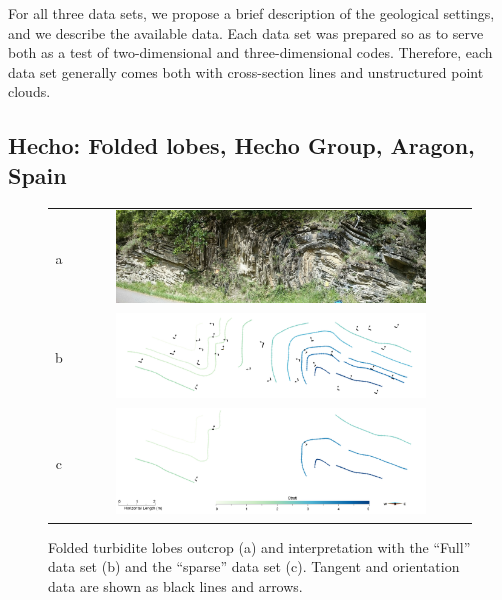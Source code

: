\documentclass[preprint]{ring20}
\begin{document}
For all three data sets, we propose a brief description of the geological settings, and we describe the available data. Each data set was prepared so as to serve both as a test of two-dimensional and three-dimensional codes. Therefore, each data set generally comes both with cross-section lines and unstructured point clouds.


\subsection{Hecho: Folded lobes, Hecho Group, Aragon, Spain}
\label{sec:Hecho}

\begin{figure}
\centering\begin{tabular}{cc}
a & \includegraphics[width=0.8\textwidth]{Hecho1}\\
b & \includegraphics[width=0.8\textwidth]{hecho2} \\
c & \includegraphics[width=0.8\textwidth]{hecho3} \\
\end{tabular}
\caption{Folded turbidite lobes outcrop (a) and interpretation with the ``Full'' data set (b) and the ``sparse'' data set (c). 
Tangent and orientation data are shown as black lines and arrows.}
\label{fig:FLH2D}
\end{figure}
\end{document}
